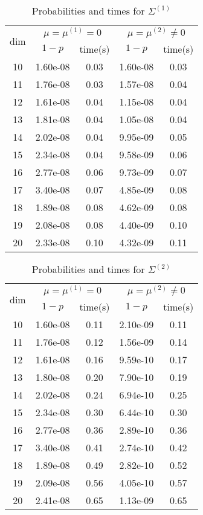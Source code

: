 \begin{table}[htbp]
\begin{center}
\begin{tabular}{c|cccc}
\hline
\multirow{2}{*}{dim}&
\multicolumn{2}{c}{$\mu=\mu^{(1)}=0$}&
\multicolumn{2}{c}{$\mu=\mu^{(2)}\neq 0$}\\
& $1-p$ & time(s) & $1-p$ & time(s)  \\
\hline
10 & 1.60e-08 & 0.03 & 1.60e-08 & 0.03 \\ 
11 & 1.76e-08 & 0.03 & 1.57e-08 & 0.04 \\ 
12 & 1.61e-08 & 0.04 & 1.15e-08 & 0.04 \\ 
13 & 1.81e-08 & 0.04 & 1.05e-08 & 0.04 \\ 
14 & 2.02e-08 & 0.04 & 9.95e-09 & 0.05 \\ 
15 & 2.34e-08 & 0.04 & 9.58e-09 & 0.06 \\ 
16 & 2.77e-08 & 0.06 & 9.73e-09 & 0.07 \\ 
17 & 3.40e-08 & 0.07 & 4.85e-09 & 0.08 \\ 
18 & 1.89e-08 & 0.08 & 4.62e-09 & 0.08 \\ 
19 & 2.08e-08 & 0.08 & 4.40e-09 & 0.10 \\ 
20 & 2.33e-08 & 0.10 & 4.32e-09 & 0.11 \\ 
\hline
\end{tabular}
\end{center}
\caption{Probabilities  and times for $\Sigma^{(1)}$}
\label{tab:hirotsu-1}
\end{table}

\begin{table}[htbp]
\begin{center}
\begin{tabular}{c|cccc}
\hline
\multirow{2}{*}{dim}&
\multicolumn{2}{c}{$\mu=\mu^{(1)}=0$}&
\multicolumn{2}{c}{$\mu=\mu^{(2)}\neq 0$}\\
& $1-p$ & time(s) & $1-p$ & time(s)  \\
\hline
10 & 1.60e-08 & 0.11 & 2.10e-09 & 0.11 \\ 
11 & 1.76e-08 & 0.12 & 1.56e-09 & 0.14 \\ 
12 & 1.61e-08 & 0.16 & 9.59e-10 & 0.17 \\ 
13 & 1.80e-08 & 0.20 & 7.90e-10 & 0.19 \\ 
14 & 2.02e-08 & 0.24 & 6.94e-10 & 0.25 \\ 
15 & 2.34e-08 & 0.30 & 6.44e-10 & 0.30 \\ 
16 & 2.77e-08 & 0.36 & 2.89e-10 & 0.36 \\ 
17 & 3.40e-08 & 0.41 & 2.74e-10 & 0.42 \\ 
18 & 1.89e-08 & 0.49 & 2.82e-10 & 0.52 \\ 
19 & 2.09e-08 & 0.56 & 4.05e-10 & 0.57 \\ 
20 & 2.41e-08 & 0.65 & 1.13e-09 & 0.65 \\ 
\hline
\end{tabular}
\end{center}
\caption{Probabilities  and times for $\Sigma^{(2)}$}
\label{tab:hirotsu-2}
\end{table}
